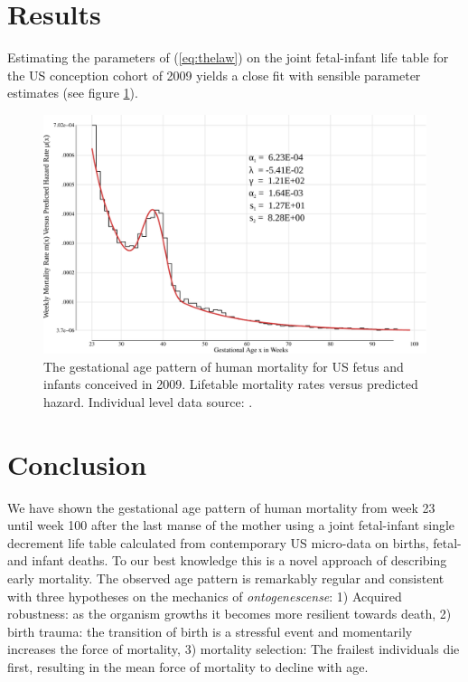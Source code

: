 \documentclass[12pt, parskip=half]{scrartcl}
\begin{document}
\section{Results} %
\label{sec:results}

Estimating the parameters of (\ref{eq:thelaw}) on the joint fetal-infant life table for the US conception cohort of 2009 yields a close fit with sensible parameter estimates (see figure \ref{fig:us_fimort_2009_mx_predobs}).

\begin{figure}[!htb]
  \centering
  \includegraphics[width = \textwidth]{./fig/us_fimort_2009_mx_predobs.pdf}
  \caption{The gestational age pattern of human mortality for US fetus and infants conceived in 2009. Lifetable mortality rates versus predicted hazard. Individual level data source: \cite{DVS2015}.}
  \label{fig:us_fimort_2009_mx_predobs}
\end{figure}

\section{Conclusion} %
\label{sec:conclusion}

We have shown the gestational age pattern of human mortality from week 23 until week 100 after the last manse of the mother using a joint fetal-infant single decrement life table calculated from contemporary US micro-data on births, fetal- and infant deaths. To our best knowledge this is a novel approach of describing early mortality. The observed age pattern is remarkably regular and consistent with three hypotheses on the mechanics of \emph{ontogenescense}: 1) Acquired robustness: as the organism growths it becomes more resilient towards death, 2) birth trauma: the transition of birth is a stressful event and momentarily increases the force of mortality, 3) mortality selection: The frailest individuals die first, resulting in the mean force of mortality to decline with age.
\end{document}
